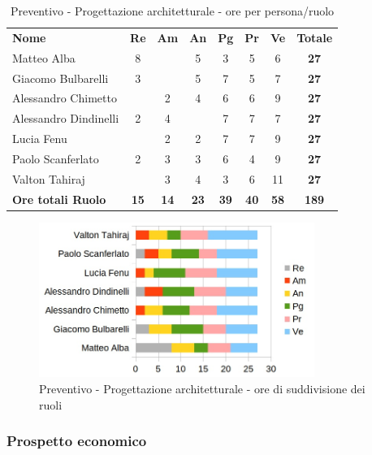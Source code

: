 		\begin{table} [h!]
			\begin{center}
				\begin{tabular} { m{3.5cm} c c c c c c c }
					\rowcolor{lightgray}
					\textbf{Nome} & \textbf{Re} & \textbf{Am} & \textbf{An} & \textbf{Pg} & \textbf{Pr} & \textbf{Ve} & \textbf{Totale} \\
					Matteo Alba & 8 & & 5 & 3 & 5 & 6 & \textbf{27} \\
					Giacomo Bulbarelli & 3 & & 5 & 7 & 5 & 7 & \textbf{27} \\
					Alessandro Chimetto & & 2 & 4 & 6 & 6 & 9 & \textbf{27} \\
					Alessandro Dindinelli & 2 & 4 & & 7 & 7 & 7 & \textbf{27} \\
					Lucia Fenu & & 2 & 2 & 7 & 7 & 9 & \textbf{27} \\
					Paolo Scanferlato & 2 & 3 & 3 & 6 & 4 & 9 & \textbf{27} \\
					Valton Tahiraj & & 3 & 4 & 3 & 6 & 11 & \textbf{27} \\
					\textbf{Ore totali Ruolo} & \textbf{15} & \textbf{14} & \textbf{23} & \textbf{39} & \textbf{40}& \textbf{58} & \textbf{189}
				\end{tabular}
				\caption{Preventivo - Progettazione architetturale - ore per persona/ruolo}
			\end{center}
		\end{table}
		
		\begin{figure} [h!]
			\centering
			\includegraphics[width=0.8\textwidth]{res/img/grafici/progettazione_architetturale_ore_ruolo.jpg}
			\caption{Preventivo - Progettazione architetturale - ore di suddivisione dei ruoli} 
		\end{figure}
		
	\newpage
	
	\subsubsection{Prospetto economico}
	
